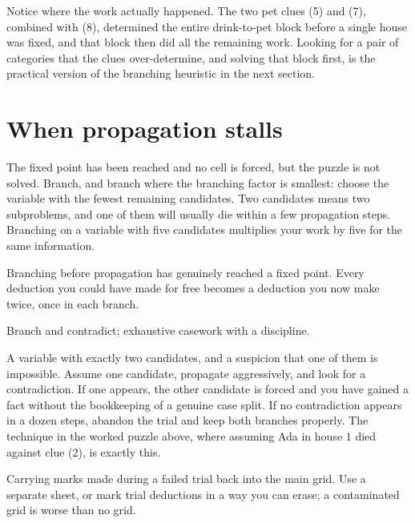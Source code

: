 Notice where the work actually happened. The two pet clues (5) and (7), combined with (8), determined the entire drink-to-pet block before a single house was fixed, and that block then did all the remaining work. Looking for a pair of categories that the clues over-determine, and solving that block first, is the practical version of the branching heuristic in the next section.

\section{When propagation stalls}

\cue The fixed point has been reached and no cell is forced, but the puzzle is not solved.
\method Branch, and branch where the branching factor is smallest: choose the variable with the fewest remaining candidates. Two candidates means two subproblems, and one of them will usually die within a few propagation steps. Branching on a variable with five candidates multiplies your work by five for the same information.

\begin{trap}
Branching before propagation has genuinely reached a fixed point. Every deduction you could have made for free becomes a deduction you now make twice, once in each branch.
\end{trap}

\begin{seealsob}Branch and contradict; exhaustive casework with a discipline.\end{seealsob}

\cue A variable with exactly two candidates, and a suspicion that one of them is impossible.
\method Assume one candidate, propagate aggressively, and look for a contradiction. If one appears, the other candidate is forced and you have gained a fact without the bookkeeping of a genuine case split. If no contradiction appears in a dozen steps, abandon the trial and keep both branches properly. The technique in the worked puzzle above, where assuming Ada in house $1$ died against clue (2), is exactly this.

\begin{trap}
Carrying marks made during a failed trial back into the main grid. Use a separate sheet, or mark trial deductions in a way you can erase; a contaminated grid is worse than no grid.
\end{trap}

